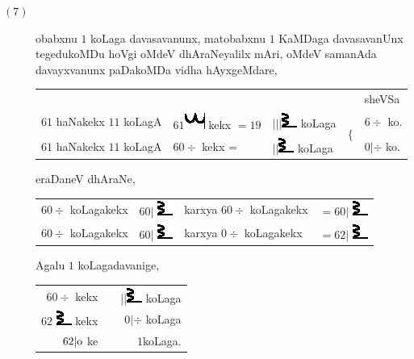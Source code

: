 \begin{description}
\item[$(7)$] obabxnu $1$ koLaga davasavanunx, matobabxnu $1$ KaMDaga
    davasavanUnx tegedukoMDu hoVgi oMdeV dhAraNeyalilx mAri, oMdeV
    samanAda davayxvanunx paDakoMDa vidha hAyxgeMdare,
    
    {\setlength\tabcolsep{1pt}
    \begin{tabular}{lllll}
    &&&& sheVSa\\
    $61$ haNakekx $11$ koLagA &
    $61$\includegraphics{images/mu.eps} kekx $= 19$ &
    $|||$\includegraphics{images/R.eps} koLaga
    & \multirow{2}{.3cm}{$\bigg \{$ }& $6 \div$ ko.\\
    $61$ haNakekx $11$ koLagA & $60 \div$ kekx = &
    $||$\includegraphics{images/R.eps} koLaga & & $0| \div $ ko.  
    \end{tabular}}

    eraDaneV dhAraNe,

    {\setlength\tabcolsep{1pt}
    \begin{tabular}{llll}
    $60 \div$ koLagakekx & $60 |$ \includegraphics{images/R.eps} &
    karxya $60 \div$ koLagakekx & $= 60
    |$ \includegraphics{images/R.eps}\\
    $60 \div$ koLagakekx & $60 |$ \includegraphics{images/R.eps} &
    karxya $0 \div$ koLagakekx & $= 62 |$ \includegraphics{images/R.eps}
    \end{tabular}}

    Agalu  $1$ koLagadavanige,

    \begin{tabular}{rcr}
    $60 \div$ kekx && ||\includegraphics{images/R.eps} koLaga\\
    $62$ \includegraphics{images/R.eps} kekx &&
    $0| \div$ koLaga\\
 \cline{1-1}
\cline{3-3}
 $62|{\rm o}$ ke && $1$\quad koLaga.
    \end{tabular}


\end{description}
